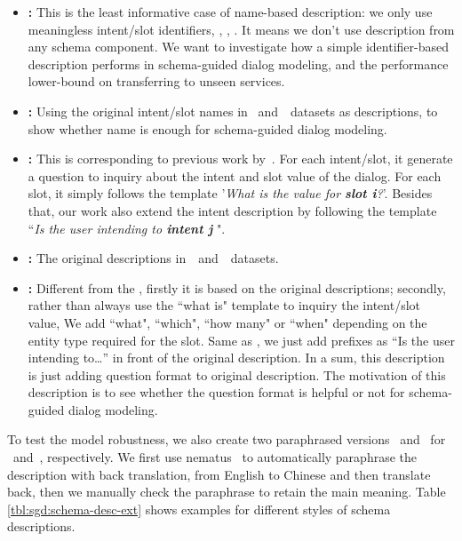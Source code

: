 \begin{itemize}
\item \textbf{\ID:} This is the least informative case of name-based
description: we only use meaningless intent/slot identifiers,
\eg, , . It means we don't use description from any
schema component. We want to investigate how a simple identifier-based
description performs in schema-guided dialog modeling, and the
performance lower-bound on transferring to unseen services.

\item \textbf{\NAMEONLY:} Using the original intent/slot names in~\sgdst
and~\multiwoz~datasets as descriptions, to show whether name is enough
for schema-guided dialog modeling.

\item \textbf{\QANAMEONLY:} This is corresponding to previous
  work by~\citet{gao2019dialog}. For each intent/slot, it generate a
  question to inquiry about the intent and slot value of the
  dialog. For each slot, it simply follows the template '{\it What
    is the value for {\bf slot i}?}'. Besides that, our work also
  extend the intent description by following the template ``{\it Is
    the user intending to {\bf intent j} }".

 \item \textbf{\ORIGIN:} The original descriptions in~\sgdst~and~\multiwoz~datasets.

 \item \textbf{\QARICH:} Different from the \QANAMEONLY, firstly it is
  based on the original descriptions; secondly, rather than always use
  the ``what is" template to inquiry the intent/slot value, We add
  ``what", ``which", ``how many" or ``when" depending on the entity
  type required for the slot.  Same as \QANAMEONLY, we just add
  prefixes as ``Is the user intending to\ldots'' in front of the original
  description. In a sum, this description is just adding question
  format to original description. The motivation of this description is
  to see whether the question format is helpful or not for
  schema-guided dialog modeling.

\end{itemize}

To test the model robustness, we also create two paraphrased
  versions \textbf{\NAMEPARA}~and \textbf{\PARAPHRASE}~for
  \NAMEONLY~and~\ORIGIN, respectively. We first use
  nematus~\cite{sennrich-etal-2017-nematus} to automatically
  paraphrase the description with back translation, from English to
  Chinese and then translate back, then we manually check the
  paraphrase to retain the main meaning. Table
  \ref{tbl:sgd:schema-desc-ext} shows examples for different styles of
  schema descriptions.

